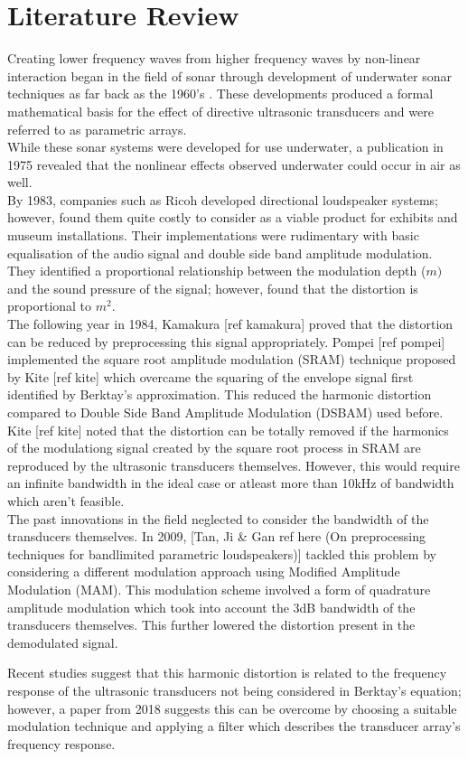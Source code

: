 \section{Literature Review}
Creating lower frequency waves from higher frequency waves by non-linear interaction began in the field of sonar through development of underwater sonar techniques as far back as the 1960's \cite{westervelt_1963}. These developments produced a formal mathematical basis for the effect of directive ultrasonic transducers and were referred to as parametric arrays.\\
While these sonar systems were developed for use underwater, a publication in 1975 \cite{bennett_blackstock_1975} revealed that the nonlinear effects observed underwater could occur in air as well.\\
By 1983, companies such as Ricoh \cite{yoneyama_fujimoto_kawamo_sasabe_1983} developed directional loudspeaker systems; however, found them quite costly to consider as a viable product for exhibits and museum installations. Their implementations were rudimentary with basic equalisation of the audio signal and double side band amplitude modulation. They identified a proportional relationship between the modulation depth ($m)$ and the sound pressure of the signal; however, found that the distortion is proportional to $m^2$.\\
The following year in 1984, Kamakura [ref kamakura] proved that the distortion can be reduced by preprocessing this signal appropriately. Pompei [ref pompei] implemented the square root amplitude modulation (SRAM) technique proposed by Kite [ref kite] which overcame the squaring of the envelope signal first identified by Berktay's approximation. This reduced the harmonic distortion compared to Double Side Band Amplitude Modulation (DSBAM) used before.\\
Kite [ref kite] noted that the distortion can be totally removed if the harmonics of the modulationg signal created by the square root process in SRAM are reproduced by the ultrasonic transducers themselves. However, this would require an infinite bandwidth in the ideal case or atleast more than 10kHz of bandwidth which aren't feasible.\\
The past innovations in the field neglected to consider the bandwidth of the transducers themselves. In 2009, [Tan, Ji & Gan ref here (On preprocessing techniques for bandlimited parametric loudspeakers)] tackled this problem by considering a different modulation approach using Modified Amplitude Modulation (MAM). This modulation scheme involved a form of quadrature amplitude modulation which took into account the 3dB bandwidth of the transducers themselves. This further lowered the distortion present in the demodulated signal.

Recent studies suggest that this harmonic distortion is related to the frequency response of the ultrasonic transducers not being considered in Berktay's equation; however, a paper from 2018 \cite{farias_abdulla_2018} suggests this can be overcome by choosing a suitable modulation technique and applying a filter which describes the transducer array's frequency response.\\
